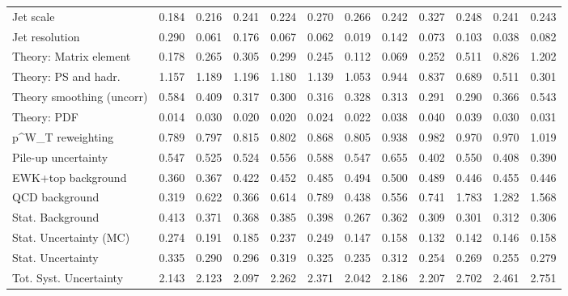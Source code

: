 \begin{tabular}{l|p{0.6cm}p{0.6cm}p{0.6cm}p{0.6cm}p{0.6cm}p{0.6cm}p{0.6cm}p{0.6cm}p{0.6cm}p{0.6cm}p{0.6cm}}
Jet scale                                & 0.184 & 0.216 & 0.241 & 0.224 & 0.270 & 0.266 & 0.242 & 0.327 & 0.248 & 0.241 & 0.243 \\
Jet resolution                           & 0.290 & 0.061 & 0.176 & 0.067 & 0.062 & 0.019 & 0.142 & 0.073 & 0.103 & 0.038 & 0.082 \\
Theory: Matrix element                   & 0.178 & 0.265 & 0.305 & 0.299 & 0.245 & 0.112 & 0.069 & 0.252 & 0.511 & 0.826 & 1.202 \\
Theory: PS and hadr.                     & 1.157 & 1.189 & 1.196 & 1.180 & 1.139 & 1.053 & 0.944 & 0.837 & 0.689 & 0.511 & 0.301 \\
Theory smoothing (uncorr)                & 0.584 & 0.409 & 0.317 & 0.300 & 0.316 & 0.328 & 0.313 & 0.291 & 0.290 & 0.366 & 0.543 \\
Theory: PDF                              & 0.014 & 0.030 & 0.020 & 0.020 & 0.024 & 0.022 & 0.038 & 0.040 & 0.039 & 0.030 & 0.031 \\
p^{W}_{T} reweighting                    & 0.789 & 0.797 & 0.815 & 0.802 & 0.868 & 0.805 & 0.938 & 0.982 & 0.970 & 0.970 & 1.019 \\
Pile-up uncertainty                      & 0.547 & 0.525 & 0.524 & 0.556 & 0.588 & 0.547 & 0.655 & 0.402 & 0.550 & 0.408 & 0.390 \\
EWK+top background                       & 0.360 & 0.367 & 0.422 & 0.452 & 0.485 & 0.494 & 0.500 & 0.489 & 0.446 & 0.455 & 0.446 \\
QCD background                           & 0.319 & 0.622 & 0.366 & 0.614 & 0.789 & 0.438 & 0.556 & 0.741 & 1.783 & 1.282 & 1.568 \\
Stat. Background                         & 0.413 & 0.371 & 0.368 & 0.385 & 0.398 & 0.267 & 0.362 & 0.309 & 0.301 & 0.312 & 0.306 \\
Stat. Uncertainty (MC)                   & 0.274 & 0.191 & 0.185 & 0.237 & 0.249 & 0.147 & 0.158 & 0.132 & 0.142 & 0.146 & 0.158 \\
\hline
Stat. Uncertainty                        & 0.335 & 0.290 & 0.296 & 0.319 & 0.325 & 0.235 & 0.312 & 0.254 & 0.269 & 0.255 & 0.279 \\
\hline
Tot. Syst. Uncertainty                   & 2.143 & 2.123 & 2.097 & 2.262 & 2.371 & 2.042 & 2.186 & 2.207 & 2.702 & 2.461 & 2.751 \\
\hline
\end{tabular}
